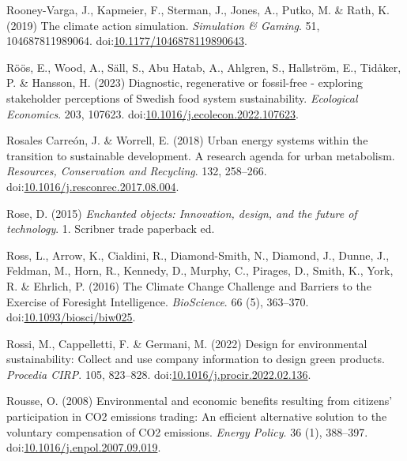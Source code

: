 \documentclass[
  letterpaper,
  DIV=11,
  numbers=noendperiod]{scrartcl}
\newlength{\cslhangindent}
\newenvironment{CSLReferences}[2] %
 {\begin{list}{}{%
  \setlength{\itemindent}{0pt}
  \setlength{\leftmargin}{0pt}
  \setlength{\parsep}{0pt}
  \ifodd #1
   \setlength{\leftmargin}{\cslhangindent}
   \setlength{\itemindent}{-1\cslhangindent}
  \fi
  \setlength{\itemsep}{#2\baselineskip}}}
 {\end{list}}
\begin{document}
\begin{CSLReferences}{0}{1}
Rooney-Varga, J., Kapmeier, F., Sterman, J., Jones, A., Putko, M. \&
Rath, K. (2019) The climate action simulation. \emph{Simulation \&
Gaming}. 51, 104687811989064.
doi:\href{https://doi.org/10.1177/1046878119890643}{10.1177/1046878119890643}.

Röös, E., Wood, A., Säll, S., Abu Hatab, A., Ahlgren, S., Hallström, E.,
Tidåker, P. \& Hansson, H. (2023) Diagnostic, regenerative or
fossil-free - exploring stakeholder perceptions of {Swedish} food system
sustainability. \emph{Ecological Economics}. 203, 107623.
doi:\href{https://doi.org/10.1016/j.ecolecon.2022.107623}{10.1016/j.ecolecon.2022.107623}.

Rosales Carreón, J. \& Worrell, E. (2018) Urban energy systems within
the transition to sustainable development. {A} research agenda for urban
metabolism. \emph{Resources, Conservation and Recycling}. 132, 258--266.
doi:\href{https://doi.org/10.1016/j.resconrec.2017.08.004}{10.1016/j.resconrec.2017.08.004}.

Rose, D. (2015) \emph{Enchanted objects: Innovation, design, and the
future of technology}. 1. Scribner trade paperback ed.

Ross, L., Arrow, K., Cialdini, R., Diamond-Smith, N., Diamond, J.,
Dunne, J., Feldman, M., Horn, R., Kennedy, D., Murphy, C., Pirages, D.,
Smith, K., York, R. \& Ehrlich, P. (2016) The {Climate Change Challenge}
and {Barriers} to the {Exercise} of {Foresight Intelligence}.
\emph{BioScience}. 66 (5), 363--370.
doi:\href{https://doi.org/10.1093/biosci/biw025}{10.1093/biosci/biw025}.

Rossi, M., Cappelletti, F. \& Germani, M. (2022) Design for
environmental sustainability: Collect and use company information to
design green products. \emph{Procedia CIRP}. 105, 823--828.
doi:\href{https://doi.org/10.1016/j.procir.2022.02.136}{10.1016/j.procir.2022.02.136}.

Rousse, O. (2008) Environmental and economic benefits resulting from
citizens' participation in {CO2} emissions trading: {An} efficient
alternative solution to the voluntary compensation of {CO2} emissions.
\emph{Energy Policy}. 36 (1), 388--397.
doi:\href{https://doi.org/10.1016/j.enpol.2007.09.019}{10.1016/j.enpol.2007.09.019}.


\end{CSLReferences}
\end{document}
